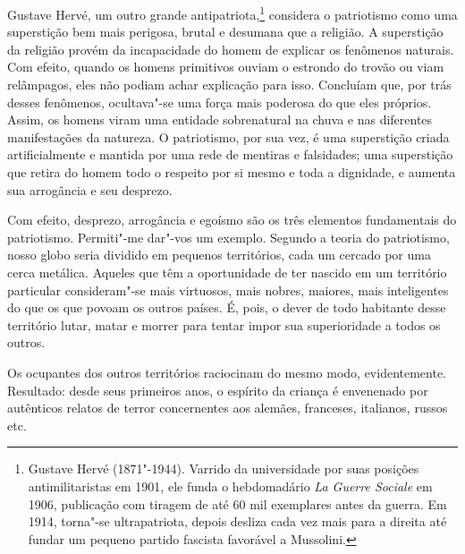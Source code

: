 Gustave Hervé, um outro grande antipatriota,\footnote{
Gustave Hervé (1871"-1944). Varrido da universidade por suas
posições antimilitaristas em 1901, ele funda o hebdomadário \textit{La Guerre
Sociale} em 1906, publicação com tiragem de até 60 mil exemplares antes
da guerra. Em 1914, torna"-se ultrapatriota, depois desliza cada vez
mais para a direita até fundar um pequeno partido fascista favorável a
Mussolini.} considera o patriotismo
como uma superstição bem mais perigosa, brutal e desumana que a
religião. A superstição da religião provém da incapacidade do homem de
explicar os fenômenos naturais. Com efeito, quando os homens primitivos
ouviam o estrondo do trovão ou viam relâmpagos, eles não podiam achar
explicação para isso. Concluíam que, por trás desses fenômenos,
ocultava"-se uma força mais poderosa do que eles próprios. Assim, os
homens viram uma entidade sobrenatural na chuva e nas diferentes
manifestações da natureza. O patriotismo, por sua vez, é uma
superstição criada artificialmente e mantida por uma rede de mentiras e
falsidades; uma superstição que retira do homem todo o respeito por si
mesmo e toda a dignidade, e aumenta sua arrogância e seu desprezo.

Com efeito, desprezo, arrogância e egoísmo são os três elementos
fundamentais do patriotismo. Permiti"-me dar"-vos um exemplo. Segundo
a teoria do patriotismo, nosso globo seria dividido em pequenos
territórios, cada um cercado por uma cerca metálica. Aqueles que têm a
oportunidade de ter nascido em um território particular consideram"-se
mais virtuosos, mais nobres, maiores, mais inteligentes do que os que
povoam os outros países. É, pois, o dever de todo habitante desse
território lutar, matar e morrer para tentar impor sua superioridade a
todos os outros.

Os ocupantes dos outros territórios raciocinam do mesmo modo,
evidentemente. Resultado: desde seus primeiros anos, o espírito da
criança é envenenado por autênticos relatos de terror concernentes aos
alemães, franceses, italianos, russos etc.

